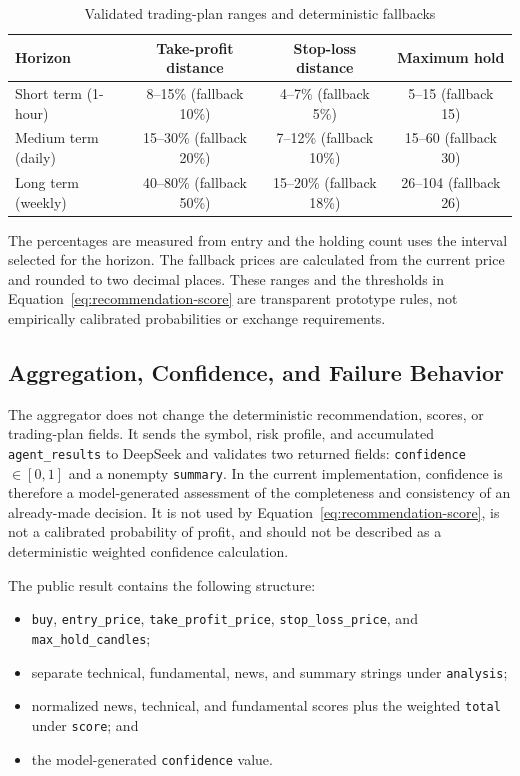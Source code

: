 \begin{table}[H]
    \centering
    \caption{Validated trading-plan ranges and deterministic fallbacks}
    \label{tab:horizon-price-boundaries}
    \footnotesize
    \setlength{\tabcolsep}{5pt}
    \renewcommand{\arraystretch}{1.2}
    \begin{tabular}{lccc}
        \toprule
        \textbf{Horizon} & \textbf{Take-profit distance} & \textbf{Stop-loss distance} & \textbf{Maximum hold} \\
        \midrule
        Short term (1-hour) & 8--15\% (fallback 10\%) & 4--7\% (fallback 5\%) & 5--15 (fallback 15) \\
        Medium term (daily) & 15--30\% (fallback 20\%) & 7--12\% (fallback 10\%) & 15--60 (fallback 30) \\
        Long term (weekly) & 40--80\% (fallback 50\%) & 15--20\% (fallback 18\%) & 26--104 (fallback 26) \\
        \bottomrule
    \end{tabular}
\end{table}

The percentages are measured from entry and the holding count uses the interval selected for the horizon. The fallback prices are calculated from the current price and rounded to two decimal places. These ranges and the thresholds in Equation~\ref{eq:recommendation-score} are transparent prototype rules, not empirically calibrated probabilities or exchange requirements.

\subsection{Aggregation, Confidence, and Failure Behavior}
\label{subsec:analysis-aggregation}

The aggregator does not change the deterministic recommendation, scores, or trading-plan fields. It sends the symbol, risk profile, and accumulated \texttt{agent\_results} to DeepSeek and validates two returned fields: \texttt{confidence}\,$\in[0,1]$ and a nonempty \texttt{summary}. In the current implementation, confidence is therefore a model-generated assessment of the completeness and consistency of an already-made decision. It is not used by Equation~\ref{eq:recommendation-score}, is not a calibrated probability of profit, and should not be described as a deterministic weighted confidence calculation.

The public result contains the following structure:

\begin{itemize}
    \item \texttt{buy}, \texttt{entry\_price}, \texttt{take\_profit\_price}, \texttt{stop\_loss\_price}, and \texttt{max\_hold\_candles};
    \item separate technical, fundamental, news, and summary strings under \texttt{analysis};
    \item normalized news, technical, and fundamental scores plus the weighted \texttt{total} under \texttt{score}; and
    \item the model-generated \texttt{confidence} value.
\end{itemize}

